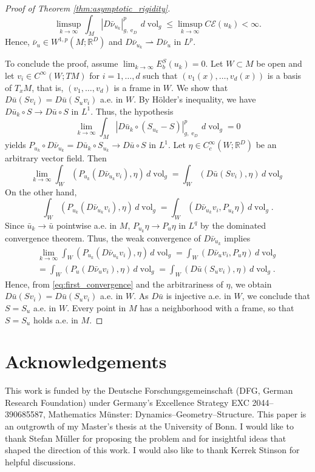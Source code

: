 \documentclass{article}
\numberwithin{equation}{section}
\theoremstyle{definition}
\theoremstyle{remark}
\DeclareMathOperator{\e}{e}
\DeclareMathOperator{\vol}{vol}
\begin{document}
\begin{proof}[Proof of Theorem \ref{thm:asymptotic_rigidity}]
    \[
    \limsup_{k \to \infty} \int_M |D\bar{\nu}_{u_k}|_{g, \e_D}^p \, d\vol_g \le \limsup_{k \to \infty} C \mathcal{E}(u_k) < \infty.
    \]
    Hence, $\bar{\nu}_u \in W^{1, p}(M; \mathbb{R}^D)$ and $D\bar{\nu}_{u_k} \rightharpoonup D\bar{\nu}_u$ in $L^p$.

    To conclude the proof, assume $\lim_{k \to \infty} E_b^S(u_k) = 0$. Let $W \subset M$ be open and let $v_i \in C^\infty(W; TM)$ for $i = 1, \dots, d$ such that $(v_1(x), \dots, v_d(x))$ is a basis of $T_xM$, that is, $(v_1, \dots, v_d)$ is a frame in $W$. We show that $D\bar{u}(Sv_i) = D\bar{u}(S_uv_i)$ a.e. in $W$. By Hölder's inequality, we have $D\bar{u}_k \circ S \to  D\bar{u} \circ S$ in $L^1$. Thus, the hypothesis
    \[
    \lim_{k \to \infty} \int_M |D\bar{u}_k \circ (S_{u_k} - S)|_{g, \e_D}^p \, d\vol_g = 0
    \]
    yields $P_{u_k} \circ D\bar{\nu}_{u_k} = D\bar{u}_k \circ S_{u_k} \to D\bar{u} \circ S$ in $L^1$. Let $\eta \in C_c^\infty(W; \mathbb{R}^D)$ be an arbitrary vector field. Then
    \begin{equation} \label{eq:first_convergence}
        \lim_{k \to \infty} \int_W (P_{u_k}(D\bar{\nu}_{u_k}v_i), \eta) \, d\vol_g = \int_W (D\bar{u}(Sv_i), \eta) \, d\vol_g
    \end{equation}
    On the other hand,
    \[
    \int_W (P_{u_k}(D\bar{\nu}_{u_k}v_i), \eta) \, d\vol_g = \int_W (D\bar{\nu}_{u_k}v_i, P_{u_k}\eta) \, d\vol_g.
    \]
    Since $\bar{u}_k \to \bar{u}$ pointwise a.e. in $M$, $P_{u_k}\eta \to P_u\eta$ in $L^q$ by the dominated convergence theorem. Thus, the weak convergence of $D\bar{\nu}_{u_k}$ implies
    \begin{multline*}
        \lim_{k \to \infty} \int_W (P_{u_k}(D\bar{\nu}_{u_k}v_i), \eta) \, d\vol_g = \int_W (D\bar{\nu}_uv_i, P_u\eta) \, d\vol_g \\
        = \int_W (P_u(D\bar{\nu}_uv_i), \eta) \, d\vol_g = \int_W (D\bar{u}(S_uv_i), \eta) \, d\vol_g.
    \end{multline*}
    Hence, from \eqref{eq:first_convergence} and the arbitrariness of $\eta$, we obtain $D\bar{u}(Sv_i) = D\bar{u}(S_uv_i)$ a.e. in $W$. As $D\bar{u}$ is injective a.e. in $W$, we conclude that $S = S_u$ a.e. in $W$. Every point in $M$ has a neighborhood with a frame, so that $S = S_u$ holds a.e. in $M$.
\end{proof}

\section*{Acknowledgements}

This work is funded by the Deutsche Forschungsgemeinschaft (DFG, German Research Foundation) under Germany's Excellence Strategy EXC 2044–390685587, Mathematics Münster: Dynamics–Geometry–Structure. This paper is an outgrowth of my Master's thesis at the University of Bonn. I would like to thank Stefan Müller for proposing the problem and for insightful ideas that shaped the direction of this work. I would also like to thank Kerrek Stinson for helpful discussions.



\end{document}
